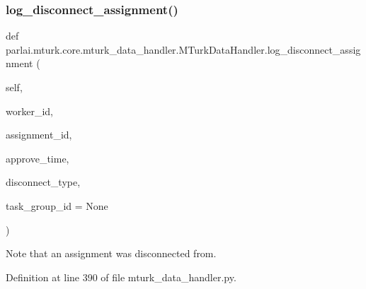 \subsubsection{\texorpdfstring{log\+\_\+disconnect\+\_\+assignment()}{log\_disconnect\_assignment()}}
{\footnotesize\ttfamily def parlai.\+mturk.\+core.\+mturk\+\_\+data\+\_\+handler.\+M\+Turk\+Data\+Handler.\+log\+\_\+disconnect\+\_\+assignment (\begin{DoxyParamCaption}\item[{}]{self,  }\item[{}]{worker\+\_\+id,  }\item[{}]{assignment\+\_\+id,  }\item[{}]{approve\+\_\+time,  }\item[{}]{disconnect\+\_\+type,  }\item[{}]{task\+\_\+group\+\_\+id = {\ttfamily None} }\end{DoxyParamCaption})}

\begin{DoxyVerb}Note that an assignment was disconnected from.
\end{DoxyVerb}
 

Definition at line 390 of file mturk\+\_\+data\+\_\+handler.\+py.



